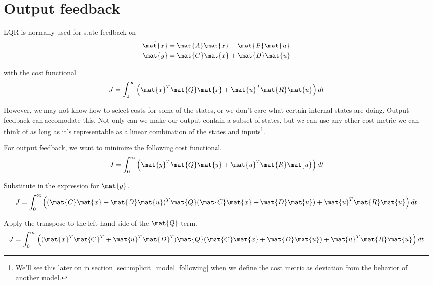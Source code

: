 \section{Output feedback}

LQR is normally used for state feedback on
\begin{align*}
  \dot{\mat{x}} &= \mat{A}\mat{x} + \mat{B}\mat{u} \\
  \mat{y} &= \mat{C}\mat{x} + \mat{D}\mat{u}
\end{align*}

with the cost functional
\begin{equation*}
  J = \int_0^\infty \left(\mat{x}^T\mat{Q}\mat{x} +
    \mat{u}^T\mat{R}\mat{u}\right) dt
\end{equation*}

However, we may not know how to select costs for some of the states, or we don't
care what certain internal states are doing. Output feedback can accomodate
this. Not only can we make our output contain a subset of states, but we can use
any other cost metric we can think of as long as it's representable as a linear
combination of the states and inputs\footnote{We'll see this later on in section
\ref{sec:implicit_model_following} when we define the cost metric as deviation
from the behavior of another model.}.

For output feedback, we want to minimize the following cost functional.
\begin{equation*}
  J = \int_0^\infty \left(\mat{y}^T\mat{Q}\mat{y} +
    \mat{u}^T\mat{R}\mat{u}\right) dt
\end{equation*}

Substitute in the expression for $\mat{y}$.
\begin{equation*}
  J = \int_0^\infty \left((\mat{C}\mat{x} + \mat{D}\mat{u})^T\mat{Q}
    (\mat{C}\mat{x} + \mat{D}\mat{u}) + \mat{u}^T\mat{R}\mat{u}\right) dt
\end{equation*}

Apply the transpose to the left-hand side of the $\mat{Q}$ term.
\begin{equation*}
  J = \int_0^\infty \left((\mat{x}^T\mat{C}^T + \mat{u}^T\mat{D}^T)\mat{Q}
    (\mat{C}\mat{x} + \mat{D}\mat{u}) + \mat{u}^T\mat{R}\mat{u}\right) dt
\end{equation*}

